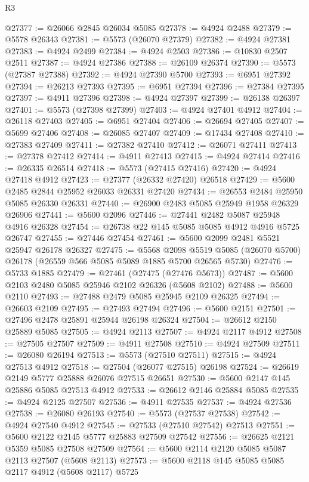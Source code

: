 \begin{lexlean}{R3}
\begin{coremodule}
@27377 := @26066 @2845 @26034 @5085
@27378 := @4924 @2488
@27379 := @5578 @26343
@27381 := @5573 (@26070 @27379)
@27382 := @4924 @27381
@27383 := @4924 @2499
@27384 := @4924 @2503
@27386 := @10830 @2507 @2511
@27387 := @4924 @27386
@27388 := @26109 @26374
@27390 := @5573 (@27387 @27388)
@27392 := @4924 @27390 @5700
@27393 := @6951 @27392
@27394 := @26213 @27393
@27395 := @6951 @27394
@27396 := @27384 @27395
@27397 := @4911 @27396
@27398 := @4924 @27397
@27399 := @26138 @26397
@27401 := @5573 (@27398 @27399)
@27403 := @4924 @27401 @4912
@27404 := @26118 @27403
@27405 := @6951 @27404
@27406 := @26694 @27405
@27407 := @5699 @27406
@27408 := @26085 @27407
@27409 := @17434 @27408
@27410 := @27383 @27409
@27411 := @27382 @27410
@27412 := @26071 @27411
@27413 := @27378 @27412
@27414 := @4911 @27413
@27415 := @4924 @27414
@27416 := @26335 @26514
@27418 := @5573 (@27415 @27416)
@27420 := @4924 @27418 @4912
@27423 := @27377 (@26332 @27420) @26518
@27429 := @5600 @2485 @2844 @25952 @26033 @26331 @27420
@27434 := @26553 @2484 @25950 @5085 @26330 @26331
@27440 := @26900 @2483 @5085 @25949 @1958 @26329 @26906
@27441 := @5600 @2096
@27446 := @27441 @2482 @5087 @25948 @4916 @26328
@27454 := @26738 @22 @145 @5085 @5085 @4912 @4916 @5725 @26747
@27455 := @27446 @27454
@27461 := @5600 @2099 @2481 @5521 @25947 @26178 @26327
@27475 := @5568
    @2098
    @5519
    @5085
    (@26070 @5700)
    @26178
    (@26559 @566 @5085 @5089 @1885 @5700 @26565 @5730)
@27476 := @5733 @1885
@27479 := @27461 (@27475 (@27476 @5673))
@27487 := @5600 @2103 @2480 @5085 @25946 @2102 @26326 (@5608 @2102)
@27488 := @5600 @2110
@27493 := @27488 @2479 @5085 @25945 @2109 @26325
@27494 := @26603 @2109
@27495 := @27493 @27494
@27496 := @5600 @2151
@27501 := @27496 @2478 @25891 @25944 @26198 @26324
@27504 := @26612 @2150 @25889 @5085
@27505 := @4924 @2113
@27507 := @4924 @2117 @4912
@27508 := @27505 @27507
@27509 := @4911 @27508
@27510 := @4924 @27509
@27511 := @26080 @26194
@27513 := @5573 (@27510 @27511)
@27515 := @4924 @27513 @4912
@27518 := @27504 (@26077 @27515) @26198
@27524 := @26619 @2149 @5777 @25888 @26076 @27515 @26651
@27530 := @5600 @2147 @145 @25886 @5085 @27513 @4912
@27533 := @26612 @2146 @25884 @5085
@27535 := @4924 @2125 @27507
@27536 := @4911 @27535
@27537 := @4924 @27536
@27538 := @26080 @26193
@27540 := @5573 (@27537 @27538)
@27542 := @4924 @27540 @4912
@27545 := @27533 (@27510 @27542) @27513
@27551 := @5600 @2122 @2145 @5777 @25883 @27509 @27542
@27556 := @26625 @2121 @5359 @5085 @27508 @27509
@27564 := @5600 @2114 @2120 @5085 @5087 @2113 @27507 (@5608 @2113)
@27573 := @5600 @2118 @145 @5085 @5085 @2117 @4912 (@5608 @2117) @5725

\end{coremodule}
\end{lexlean}
